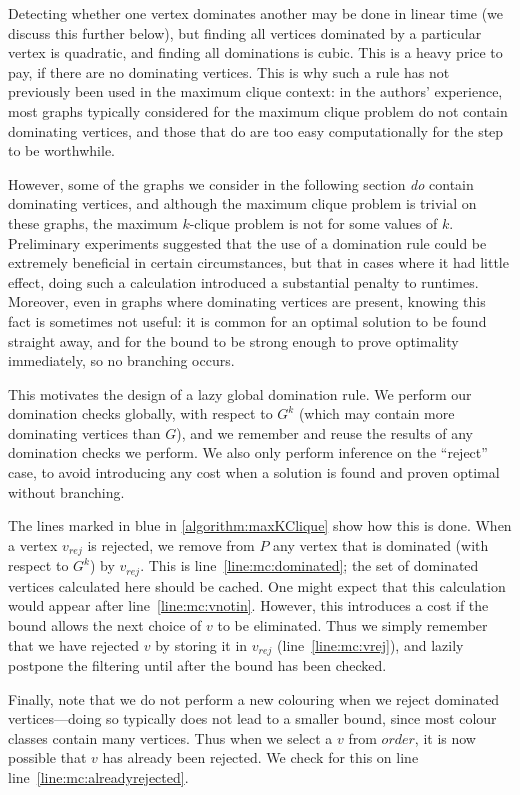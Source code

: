 \documentclass[letterpaper]{article}
\newcommand{\mcline}[1]{line~\ref{line:mc:#1}}
\newcommand{\order}{\mathit{order}}
\newcommand{\vrej}{v_{\mathit{rej}}}
\begin{document}
Detecting whether one vertex dominates another may be done in linear time (we discuss this further
below), but finding all vertices dominated by a particular vertex is quadratic, and finding all
dominations is cubic. This is a heavy price to pay, if there are no dominating vertices.  This is
why such a rule has not previously been used in the maximum clique context: in the authors'
experience, most graphs typically considered for the maximum clique problem do not contain
dominating vertices, and those that do are too easy computationally for the step to be worthwhile.

However, some of the graphs we consider in the following section \emph{do} contain dominating
vertices, and although the maximum clique problem is trivial on these graphs, the maximum $k$-clique
problem is not for some values of $k$. Preliminary experiments suggested that the use of a
domination rule could be extremely beneficial in certain circumstances, but that in cases where it
had little effect, doing such a calculation introduced a substantial penalty to runtimes. Moreover,
even in graphs where dominating vertices are present, knowing this fact is sometimes not useful: it
is common for an optimal solution to be found straight away, and for the bound to be strong enough
to prove optimality immediately, so no branching occurs.

This motivates the design of a lazy global domination rule. We perform our domination checks
globally, with respect to $G^k$ (which may contain more dominating vertices than $G$), and we
remember and reuse the results of any domination checks we perform. We also only perform inference
on the ``reject'' case, to avoid introducing any cost when a solution is found and proven optimal
without branching.

The lines marked in blue in \cref{algorithm:maxKClique} show how this is done. When a vertex $\vrej$
is rejected, we remove from $P$ any vertex that is dominated (with respect to $G^k$) by $\vrej$.
This is \mcline{dominated}; the set of dominated vertices calculated here should be cached.  One
might expect that this calculation would appear after \mcline{vnotin}. However, this introduces a
cost if the bound allows the next choice of $v$ to be eliminated. Thus we simply remember that we
have rejected $v$ by storing it in $\vrej$ (\mcline{vrej}), and lazily postpone the filtering until
after the bound has been checked.

Finally, note that we do not perform a new colouring when we reject dominated vertices---doing so
typically does not lead to a smaller bound, since most colour classes contain many vertices. Thus
when we select a $v$ from $\order$, it is now possible that $v$ has already been rejected. We check
for this on line \mcline{alreadyrejected}.
\end{document}
